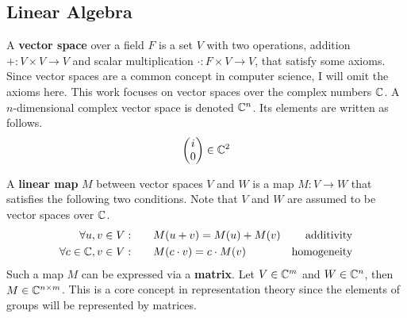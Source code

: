 \subsection{Linear Algebra}

A \textbf{vector space} over a field $F$ is a set $V$ with two operations, addition $+: V \times V \to V$ and scalar multiplication $\cdot: F \times V \to V$, that satisfy some axioms.
Since vector spaces are a common concept in computer science, I will omit the axioms here.
This work focuses on vector spaces over the complex numbers $\mathbb{C}$.
A $n$-dimensional complex vector space is denoted $\mathbb{C}^n$.
Its elements are written as follows.
\begin{align}
    \begin{pmatrix}
        i \\ 0
    \end{pmatrix} \in \mathbb{C}^2
\end{align}

A \textbf{linear map} $M$ between vector spaces $V$ and $W$ is a map $M: V \to W$ that satisfies the following two conditions.
Note that $V$ and $W$ are assumed to be vector spaces over $\mathbb{C}$.
\begin{align}
    \forall u, v \in V: \qquad & M(u + v) = M(u) + M(v) & \text{additivity} \\
    \forall c \in \mathbb{C}, v \in V: \qquad & M(c \cdot v) = c \cdot M(v) & \text{homogeneity}
\end{align}
Such a map $M$ can be expressed via a \textbf{matrix}.
Let $V \in \mathbb{C}^m$ and $W \in \mathbb{C}^n$, then $M \in \mathbb{C}^{n \times m}$.
This is a core concept in representation theory since the elements of groups will be represented by matrices.
